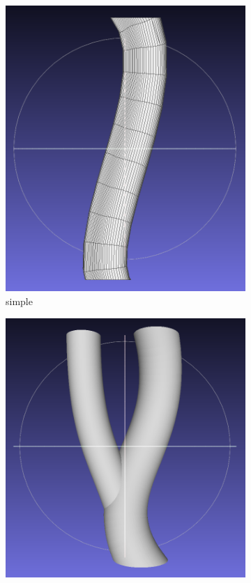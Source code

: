 \documentclass[11p, titlepage]{article}
\begin{document}
\begin{figure}[h]
     \centering
     \begin{subfigure}[b]{0.3\textwidth}
         \centering
         \includegraphics[width=\textwidth]{originals/simple}
         \caption{simple}
         \label{fig:simple}
     \end{subfigure}
     \hfill
     \begin{subfigure}[b]{0.3\textwidth}
         \centering
         \includegraphics[width=\textwidth]{originals/simple-branch}

\end{subfigure}
\end{figure}
\end{document}
